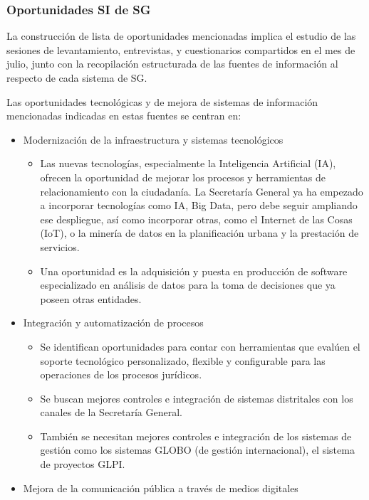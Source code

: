 \documentclass[
	a4paper, %
	12pt, %
]{include/CSSullivanBusinessReport}
\def\tightlist{}
\begin{document}
\subsubsection{Oportunidades SI de SG}\label{sec:oportunidades-si-de-sg}

La construcción de lista de oportunidades mencionadas implica el estudio
de las sesiones de levantamiento, entrevistas, y cuestionarios
compartidos en el mes de julio, junto con la recopilación estructurada
de las fuentes de información al respecto de cada sistema de SG.

Las oportunidades tecnológicas y de mejora de sistemas de información
mencionadas indicadas en estas fuentes se centran en:

\begin{itemize}
\item
  Modernización de la infraestructura y sistemas tecnológicos

  \begin{itemize}
  \tightlist
  \item
    Las nuevas tecnologías, especialmente la Inteligencia Artificial
    (IA), ofrecen la oportunidad de mejorar los procesos y herramientas
    de relacionamiento con la ciudadanía. La Secretaría General ya ha
    empezado a incorporar tecnologías como IA, Big Data, pero debe
    seguir ampliando ese despliegue, así como incorporar otras, como el
    Internet de las Cosas (IoT), o la minería de datos en la
    planificación urbana y la prestación de servicios.
  \item
    Una oportunidad es la adquisición y puesta en producción de software
    especializado en análisis de datos para la toma de decisiones que ya
    poseen otras entidades.
  \end{itemize}
\item
  Integración y automatización de procesos

  \begin{itemize}
  \tightlist
  \item
    Se identifican oportunidades para contar con herramientas que
    evalúen el soporte tecnológico personalizado, flexible y
    configurable para las operaciones de los procesos jurídicos.
  \item
    Se buscan mejores controles e integración de sistemas distritales
    con los canales de la Secretaría General.
  \item
    También se necesitan mejores controles e integración de los sistemas
    de gestión como los sistemas GLOBO (de gestión internacional), el
    sistema de proyectos GLPI.
  \end{itemize}
\item
  Mejora de la comunicación pública a través de medios digitales


\end{itemize}
\end{document}
